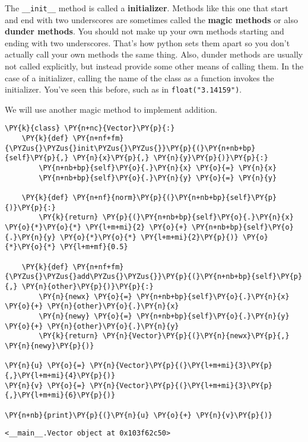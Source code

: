 The \texttt{\_\_init\_\_} method is called a \textbf{initializer}.  Methods like this one that start and end with two underscores are sometimes called the \textbf{magic methods} or also \textbf{dunder methods}.  You should not make up your own methods starting and ending with two underscores.  That's how python sets them apart so you don't actually call your own methods the same thing.  Also, dunder methods are usually not called explicitly, but instead provide some other means of calling them.  In the case of a initializer, calling the name of the class as a function invokes the initializer.  You've seen this before, such as in \texttt{float("3.14159")}.


We will use another magic method to implement addition.


\begin{Verbatim}[commandchars=\\\{\}]
\PY{k}{class} \PY{n+nc}{Vector}\PY{p}{:}
    \PY{k}{def} \PY{n+nf+fm}{\PYZus{}\PYZus{}init\PYZus{}\PYZus{}}\PY{p}{(}\PY{n+nb+bp}{self}\PY{p}{,} \PY{n}{x}\PY{p}{,} \PY{n}{y}\PY{p}{)}\PY{p}{:}
        \PY{n+nb+bp}{self}\PY{o}{.}\PY{n}{x} \PY{o}{=} \PY{n}{x}
        \PY{n+nb+bp}{self}\PY{o}{.}\PY{n}{y} \PY{o}{=} \PY{n}{y}

    \PY{k}{def} \PY{n+nf}{norm}\PY{p}{(}\PY{n+nb+bp}{self}\PY{p}{)}\PY{p}{:}
        \PY{k}{return} \PY{p}{(}\PY{n+nb+bp}{self}\PY{o}{.}\PY{n}{x} \PY{o}{*}\PY{o}{*} \PY{l+m+mi}{2} \PY{o}{+} \PY{n+nb+bp}{self}\PY{o}{.}\PY{n}{y} \PY{o}{*}\PY{o}{*} \PY{l+m+mi}{2}\PY{p}{)} \PY{o}{*}\PY{o}{*} \PY{l+m+mf}{0.5}

    \PY{k}{def} \PY{n+nf+fm}{\PYZus{}\PYZus{}add\PYZus{}\PYZus{}}\PY{p}{(}\PY{n+nb+bp}{self}\PY{p}{,} \PY{n}{other}\PY{p}{)}\PY{p}{:}
        \PY{n}{newx} \PY{o}{=} \PY{n+nb+bp}{self}\PY{o}{.}\PY{n}{x} \PY{o}{+} \PY{n}{other}\PY{o}{.}\PY{n}{x}
        \PY{n}{newy} \PY{o}{=} \PY{n+nb+bp}{self}\PY{o}{.}\PY{n}{y} \PY{o}{+} \PY{n}{other}\PY{o}{.}\PY{n}{y}
        \PY{k}{return} \PY{n}{Vector}\PY{p}{(}\PY{n}{newx}\PY{p}{,} \PY{n}{newy}\PY{p}{)}

\PY{n}{u} \PY{o}{=} \PY{n}{Vector}\PY{p}{(}\PY{l+m+mi}{3}\PY{p}{,}\PY{l+m+mi}{4}\PY{p}{)}
\PY{n}{v} \PY{o}{=} \PY{n}{Vector}\PY{p}{(}\PY{l+m+mi}{3}\PY{p}{,}\PY{l+m+mi}{6}\PY{p}{)}

\PY{n+nb}{print}\PY{p}{(}\PY{n}{u} \PY{o}{+} \PY{n}{v}\PY{p}{)}
\end{Verbatim}

\begin{Verbatim}
<__main__.Vector object at 0x103f62c50>

\end{Verbatim}


